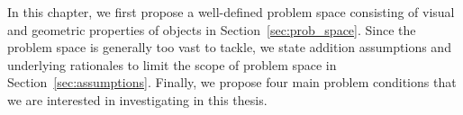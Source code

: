 In this chapter, we first propose a well-defined problem space consisting of visual and geometric properties of objects in Section~\ref{sec:prob_space}. Since the problem space is generally too vast to tackle, we state addition assumptions and underlying rationales to limit the scope of problem space in Section~\ref{sec:assumptions}. Finally, we propose four main problem conditions that we are interested in investigating in this thesis.



